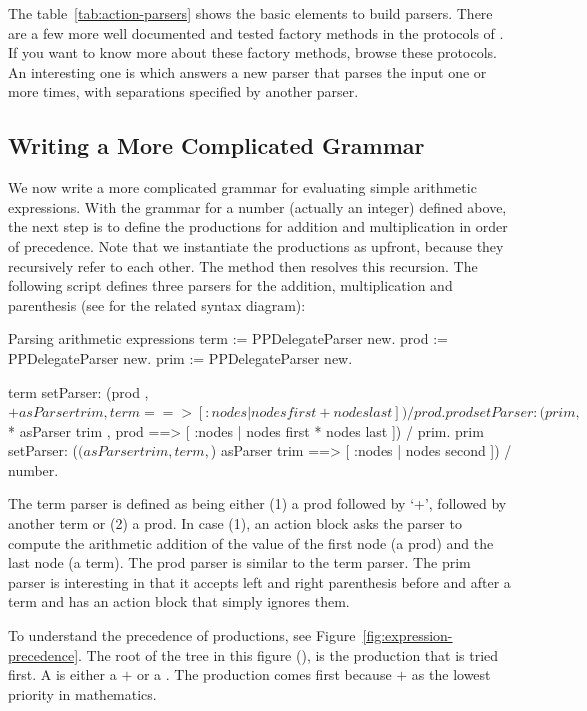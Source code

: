 \documentclass[a4paper,10pt,twoside]{book}
\begin{document}
The table~\ref{tab:action-parsers} shows the basic elements to build
parsers. There are a few more well documented and tested factory
methods in the  protocols of . If you
want to know more about these factory methods, browse these protocols.
An interesting one is  which answers a new parser
that parses the input one or more times, with separations specified by
another parser.

\subsection{Writing a More Complicated Grammar}

We now write a more complicated grammar for evaluating simple
arithmetic expressions. With the grammar for a number (actually an
integer) defined above, the next step is to define the productions for
addition and multiplication in order of precedence. Note that we
instantiate the productions as  upfront,
because they recursively refer to each other. The method
 then resolves this recursion. The following script
defines three parsers for the addition, multiplication and parenthesis
(see  for the related syntax diagram):

\begin{script}[arithmetic]{Parsing arithmetic expressions}
term := PPDelegateParser new.
prod := PPDelegateParser new.
prim := PPDelegateParser new.

term setParser: (prod , $+ asParser trim , term ==> [ :nodes | nodes first + nodes last ])
                     / prod.
prod setParser: (prim , $* asParser trim , prod ==> [ :nodes | nodes first * nodes last ])
                     / prim.
prim setParser: ($( asParser trim , term , $) asParser trim ==> [ :nodes | nodes second ])
                     / number.
\end{script}

The term parser is defined as being either (1) a prod followed by `+',
followed by another term or (2) a prod. In case (1), an action block
asks the parser to compute the arithmetic addition of the value of the
first node (a prod) and the last node (a term). The prod parser is
similar to the term parser. The prim parser is interesting in that it
accepts left and right parenthesis before and after a term and has an
action block that simply ignores them.

To understand the precedence of productions, see
Figure~\ref{fig:expression-precedence}. The root of the tree in this
figure (), is the production that is tried first. A 
is either a $+$ or a . The  production comes first
because $+$ as the lowest priority in mathematics.
\end{document}
